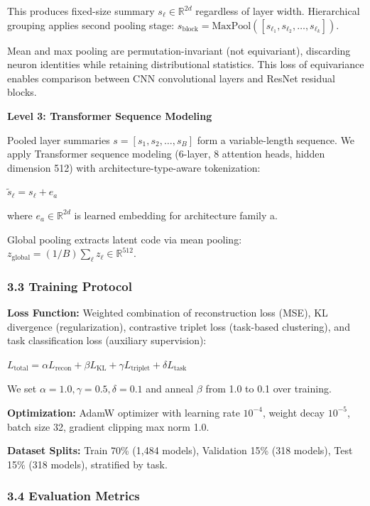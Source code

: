 This produces fixed-size summary $s_\ell \in \mathbb{R}^{2d}$ regardless of layer width. Hierarchical grouping applies second pooling stage: $s_{\text{block}} = \text{MaxPool}([s_{\ell_1}, s_{\ell_2}, \ldots, s_{\ell_k}])$.

Mean and max pooling are permutation-invariant (not equivariant), discarding neuron identities while retaining distributional statistics. This loss of equivariance enables comparison between CNN convolutional layers and ResNet residual blocks.

\textbf{Level 3: Transformer Sequence Modeling}

Pooled layer summaries $s = [s_1, s_2, \ldots, s_B]$ form a variable-length sequence. We apply Transformer sequence modeling (6-layer, 8 attention heads, hidden dimension 512) with architecture-type-aware tokenization:

$\tilde{s}_\ell = s_\ell + e_a$

where $e_a \in \mathbb{R}^{2d}$ is learned embedding for architecture family a.

Global pooling extracts latent code via mean pooling: $z_{\text{global}} = (1/B) \sum_\ell z_\ell \in \mathbb{R}^{512}$.

\subsubsection{3.3 Training Protocol}

\textbf{Loss Function:} Weighted combination of reconstruction loss (MSE), KL divergence (regularization), contrastive triplet loss (task-based clustering), and task classification loss (auxiliary supervision):

$L_{\text{total}} = \alpha L_{\text{recon}} + \beta L_{\text{KL}} + \gamma L_{\text{triplet}} + \delta L_{\text{task}}$

We set $\alpha = 1.0, \gamma = 0.5, \delta = 0.1$ and anneal $\beta$ from 1.0 to 0.1 over training.

\textbf{Optimization:} AdamW optimizer with learning rate $10^{-4}$, weight decay $10^{-5}$, batch size 32, gradient clipping max norm 1.0.

\textbf{Dataset Splits:} Train 70\% (1,484 models), Validation 15\% (318 models), Test 15\% (318 models), stratified by task.

\subsubsection{3.4 Evaluation Metrics}

